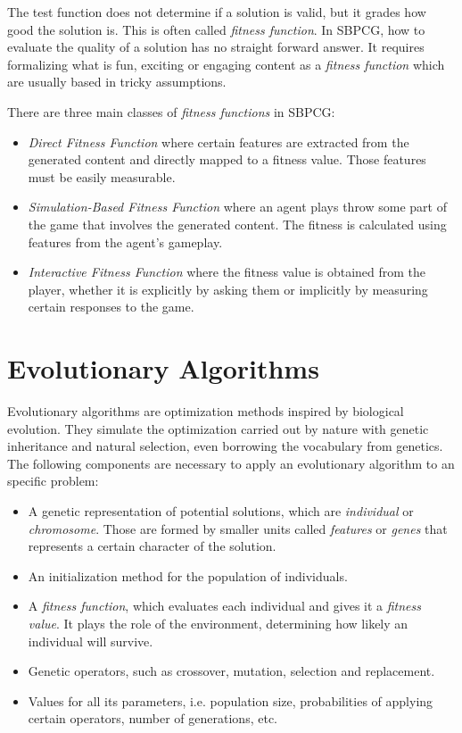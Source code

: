 The test function does not determine if a solution is valid, but it grades how good the solution is. This is often called \textit{fitness function}. In \ac{SBPCG}, how to evaluate the quality of a solution has no straight forward answer. It requires formalizing what is fun, exciting or engaging content  as a \textit{fitness function} which are usually based in tricky assumptions. 

There are three main classes of \textit{fitness functions} in \ac{SBPCG}\cite{togelius2010search}:

\begin{itemize}
	\item \textit{Direct Fitness Function} where certain features are extracted from the generated  content and directly mapped to a fitness value. Those features must be easily measurable.
	\item \textit{Simulation-Based Fitness Function} where an agent plays throw some part of the game that involves the generated content. The fitness is calculated using features from the agent's gameplay.
	\item \textit{Interactive Fitness Function} where the fitness value is obtained from the player, whether it is explicitly by asking them or implicitly by measuring certain responses to the game.
\end{itemize}


\section{Evolutionary Algorithms}\label{s:EAoverview}

Evolutionary algorithms are optimization methods inspired by biological evolution. They simulate the optimization carried out by nature with genetic inheritance and natural selection, even borrowing the vocabulary from genetics. The following components are necessary to apply an evolutionary algorithm to an specific problem:
\begin{itemize}
	\item A genetic representation of potential solutions, which are \textit{individual} or \textit{chromosome}. Those are formed by smaller units called \textit{features} or \textit{genes} that represents a certain character of the solution.
	\item An initialization method for the population of individuals.
	\item A \textit{fitness function}, which evaluates each individual and gives it a \textit{fitness value}. It plays the role of the environment, determining how likely an individual will survive.
	\item Genetic operators, such as crossover, mutation, selection and replacement.
	\item Values for all its parameters, i.e. population size, probabilities of applying certain operators, number of generations, etc.
\end{itemize}

